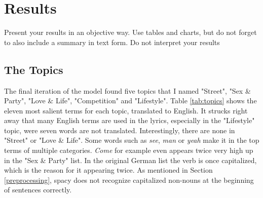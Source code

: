 \documentclass[conference]{IEEEtran}
\begin{document}
\section{Results} \label{results}
Present your results in an objective way. Use tables and charts, but do not
forget to also include a summary in text form. Do not interpret your results

\subsection{The Topics}
The final iteration of the model found five topics that I named "Street", "Sex \& Party", "Love \& Life", "Competition" and "Lifestyle". Table \ref{tab:topics} shows the eleven most salient terms for each topic, translated to English. It strucks right away that many English terms are used in the lyrics, especially in the "Lifestyle" topic, were seven words are not translated. Interestingly, there are none in "Street" or "Love \& Life". Some words such as \textit{see}, \textit{man} or \textit{yeah} make it in the top terms of multiple categories. \textit{Come} for example even appears twice very high up in the "Sex \& Party" list. In the original German list the verb is once capitalized, which is the reason for it appearing twice. As mentioned in Section \ref{preprocessing}, spacy does not recognize capitalized non-nouns at the beginning of sentences correctly.
\end{document}
